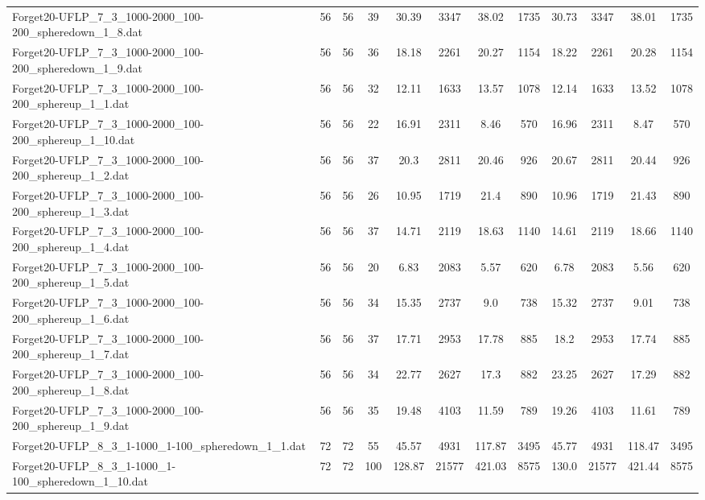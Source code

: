 \begin{sidewaystable}[!ht]
{\begin{tabular}{lccccccccccc}
Forget20-UFLP\_7\_3\_1000-2000\_100-200\_spheredown\_1\_8.dat & 56 & 56 & 39 & 30.39 & 3347 & 38.02 & 1735 & 30.73 & 3347 & 38.01 & 1735 \\
Forget20-UFLP\_7\_3\_1000-2000\_100-200\_spheredown\_1\_9.dat & 56 & 56 & 36 &  \textcolor{blue2}{18.18} & 2261 & 20.27 & 1154 & 18.22 & 2261 & 20.28 & 1154 \\
Forget20-UFLP\_7\_3\_1000-2000\_100-200\_sphereup\_1\_1.dat & 56 & 56 & 32 & 12.11 & 1633 & 13.57 & 1078 & 12.14 & 1633 & 13.52 & 1078 \\
Forget20-UFLP\_7\_3\_1000-2000\_100-200\_sphereup\_1\_10.dat & 56 & 56 & 22 & 16.91 & 2311 &  \textcolor{blue2}{8.46} & 570 & 16.96 & 2311 & 8.47 & 570 \\
Forget20-UFLP\_7\_3\_1000-2000\_100-200\_sphereup\_1\_2.dat & 56 & 56 & 37 &  \textcolor{blue2}{20.3} & 2811 & 20.46 & 926 & 20.67 & 2811 & 20.44 & 926 \\
Forget20-UFLP\_7\_3\_1000-2000\_100-200\_sphereup\_1\_3.dat & 56 & 56 & 26 &  \textcolor{blue2}{10.95} & 1719 & 21.4 & 890 & 10.96 & 1719 & 21.43 & 890 \\
Forget20-UFLP\_7\_3\_1000-2000\_100-200\_sphereup\_1\_4.dat & 56 & 56 & 37 & 14.71 & 2119 & 18.63 & 1140 &  \textcolor{blue2}{14.61} & 2119 & 18.66 & 1140 \\
Forget20-UFLP\_7\_3\_1000-2000\_100-200\_sphereup\_1\_5.dat & 56 & 56 & 20 & 6.83 & 2083 & 5.57 & 620 & 6.78 & 2083 &  \textcolor{blue2}{5.56} & 620 \\
Forget20-UFLP\_7\_3\_1000-2000\_100-200\_sphereup\_1\_6.dat & 56 & 56 & 34 & 15.35 & 2737 &  \textcolor{blue2}{9.0} & 738 & 15.32 & 2737 & 9.01 & 738 \\
Forget20-UFLP\_7\_3\_1000-2000\_100-200\_sphereup\_1\_7.dat & 56 & 56 & 37 & 17.71 & 2953 & 17.78 & 885 & 18.2 & 2953 & 17.74 & 885 \\
Forget20-UFLP\_7\_3\_1000-2000\_100-200\_sphereup\_1\_8.dat & 56 & 56 & 34 & 22.77 & 2627 & 17.3 & 882 & 23.25 & 2627 &  \textcolor{blue2}{17.29} & 882 \\
Forget20-UFLP\_7\_3\_1000-2000\_100-200\_sphereup\_1\_9.dat & 56 & 56 & 35 & 19.48 & 4103 &  \textcolor{blue2}{11.59} & 789 & 19.26 & 4103 & 11.61 & 789 \\
Forget20-UFLP\_8\_3\_1-1000\_1-100\_spheredown\_1\_1.dat & 72 & 72 & 55 &  \textcolor{blue2}{45.57} & 4931 & 117.87 & 3495 & 45.77 & 4931 & 118.47 & 3495 \\
Forget20-UFLP\_8\_3\_1-1000\_1-100\_spheredown\_1\_10.dat & 72 & 72 & 100 & 128.87 & 21577 & 421.03 & 8575 & 130.0 & 21577 & 421.44 & 8575 \\

\end{tabular}}
\end{sidewaystable}
